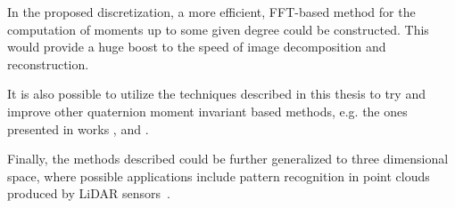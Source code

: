 In the proposed discretization, a more efficient, FFT-based method for the computation of moments up to some given degree could be constructed. This would provide a huge boost to the speed of image decomposition and reconstruction.

It is also possible to utilize the techniques described in this thesis to try and improve other quaternion moment invariant based methods, e.g. the ones presented in works \cite{chebyshev-fourier}, \cite{Yang,Wang,Singh} and \cite{HosnyLegendre,HosnyChebyshev,WangAcc,LiuAcc}. 

Finally, the methods described could be further generalized to three dimensional space, where possible applications include pattern recognition in point clouds produced by LiDAR sensors~\cite{zernike_lidar}.